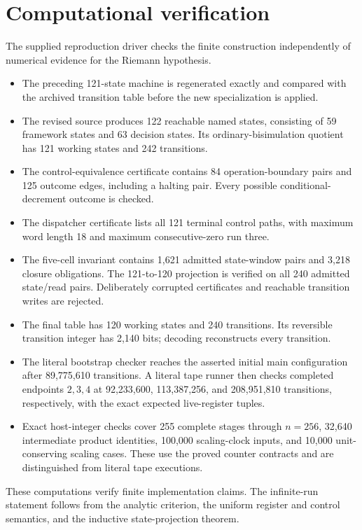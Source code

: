 \documentclass[10pt]{article}
\theoremstyle{definition}
\begin{document}
\section{Computational verification}

The supplied reproduction driver checks the finite construction independently
of numerical evidence for the Riemann hypothesis.
\begin{itemize}
\item The preceding 121-state machine is regenerated exactly and compared
with the archived transition table before the new specialization is applied.
\item The revised source produces 122 reachable named states, consisting of
59 framework states and 63 decision states. Its ordinary-bisimulation quotient
has 121 working states and 242 transitions.
\item The control-equivalence certificate contains 84 operation-boundary
pairs and 125 outcome edges, including a halting pair. Every possible
conditional-decrement outcome is checked.
\item The dispatcher certificate lists all 121 terminal control paths,
with maximum word length 18 and maximum consecutive-zero run three.
\item The five-cell invariant contains 1,621 admitted state-window pairs
and 3,218 closure obligations. The 121-to-120 projection is verified on all
240 admitted state/read pairs. Deliberately corrupted certificates and
reachable transition writes are rejected.
\item The final table has 120 working states and 240 transitions. Its
reversible transition integer has 2,140 bits; decoding reconstructs every
transition.
\item The literal bootstrap checker reaches the asserted initial main
configuration after 89,775,610 transitions. A literal tape runner then checks
completed endpoints $2,3,4$ at 92,233,600, 113,387,256, and 208,951,810
transitions, respectively, with the exact expected live-register tuples.
\item Exact host-integer checks cover 255 complete stages through $n=256$,
32,640 intermediate product identities, 100,000 scaling-clock inputs, and
10,000 unit-conserving scaling cases. These use the proved counter contracts
and are distinguished from literal tape executions.
\end{itemize}

These computations verify finite implementation claims. The infinite-run
statement follows from the analytic criterion, the uniform register and
control semantics, and the inductive state-projection theorem.
\end{document}
